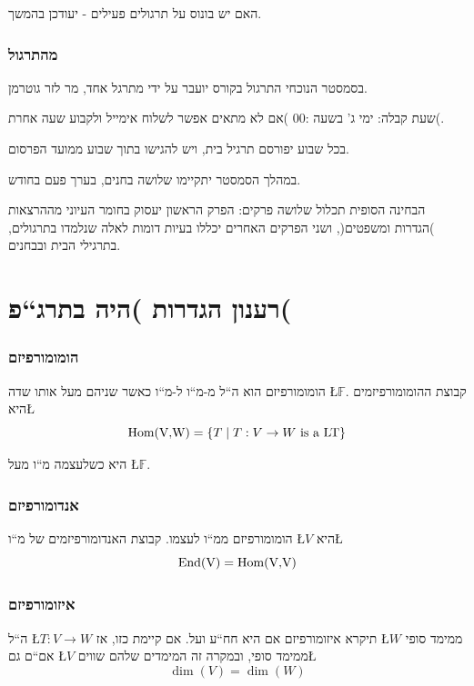 \documentclass[english,hebrew]{article}
\begin{document}
האם יש בונוס על תרגולים פעילים - יעודכן בהמשך. 

\section{מהתרגול}

בסמסטר הנוכחי התרגול בקורס יועבר על ידי מתרגל אחד, מר לזר גוטרמן.

שעת קבלה: ימי ג' בשעה {:00\endL} )אם לא מתאים אפשר לשלוח
אימייל ולקבוע שעה אחרת(.

בכל שבוע יפורסם תרגיל בית, ויש להגישו בתוך שבוע ממועד הפרסום.

במהלך הסמסטר יתקיימו שלושה בחנים, בערך פעם בחודש.

הבחינה הסופית תכלול שלושה פרקים: הפרק הראשון יעסוק בחומר העיוני מההרצאות
)הגדרות ומשפטים(, ושני הפרקים האחרים יכללו בעיות דומות לאלה שנלמדו
בתרגולים, בתרגילי הבית ובבחנים.

\part{רענון הגדרות )היה בתרג\textquotedblleft פ(}

\section{הומומורפיזם}

הומומורפיזם הוא ה\textquotedblleft ל מ-מ\textquotedblleft ו ל-מ\textquotedblleft ו
כאשר שניהם מעל אותו שדה \L{$\mathbb{F}$}. קבוצת ההומומורפיזמים היא\L{%
\[
\text{\text{Hom}(V,W)}=\left\{ T\mid T:V\rightarrow W\text{ is a LT}\right\} 
\]
}%

היא כשלעצמה מ\textquotedblleft ו מעל \L{$\mathbb{F}$}.

\section{אנדומורפיזם}

הומומורפיזם ממ\textquotedblleft ו לעצמו. קבוצת האנדומורפיזמים של מ\textquotedblleft ו
\L{$V$} היא\L{%
\[
\text{\text{End}(V)}=\text{\text{Hom}(V,V)}
\]
}%

\section{איזומורפיזם}

ה\textquotedblleft ל \L{$T:V\rightarrow W$} תיקרא איזומורפיזם אם
היא חח\textquotedblleft ע ועל. אם קיימת כזו, אז \L{$W$} ממימד סופי
אם\textquotedblleft ם גם \L{$V$} ממימד סופי, ובמקרה זה המימדים שלהם
שווים\L{%
\[
\dim(V)=\dim(W)
\]
}%
\end{document}
